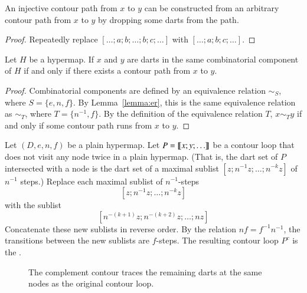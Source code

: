\begin{lemma} 
An injective contour path from
  $x$ to $y$ can be constructed from an arbitrary contour path from
  $x$ to $y$ by dropping some darts from the path.
\end{lemma}

\begin{proof} Repeatedly replace $[\ldots;a;b;\ldots;b;c;\ldots]$ with
$[\ldots;a;b;c;\ldots]$.
\end{proof}





\begin{lemma}\label{lemma:connect-contour}  
Let $H$ be a hypermap.
If $x$ and $y$ are darts in the same combinatorial component of $H$ if and only if
there exists a contour path from $x$ to $y$.
\end{lemma}

\begin{proof} 
Combinatorial components are defined by an equivalence relation $\sim_S$, where
$S = \{e,n,f\}$.  By Lemma~\ref{lemma:er}, this is the same equivalence relation as
$\sim_T$, where $T = \{n^{-1},f\}$.  By the definition of the equivalence relation $T$,
$x\sim_T y$ if and only if some contour path runs from $x$ to $y$.
\end{proof}
%

\begin{definition}[complement] 
Let $(D,e,n,f)$ be a plain hypermap.
Let $P={\llbracket{x;y;\ldots}\rrbracket}$ be a contour loop that does not visit any node
twice in a plain hypermap.   (That is, the dart set of $P$ intersected with a node
is the dart set of a maximal sublist $[z;n^{-1}z;\ldots;n^{-k}z]$ of $n^{-1}$ steps.)
 Replace each maximal sublist of
$n^{-1}$-steps
\[ 
[z;n^{-1} z; \ldots; n^{-k} z]
\] 
with the sublist
\[ 
[n^{-(k+1)} z;n^{-(k+2)} z;\ldots; n z]
\] 
Concatenate these new sublists in reverse order.  By the relation $n f = f^{-1} n^{-1}$,
the transitions between the new sublists are $f$-steps.
The resulting contour loop $P^c$
is the . 
\end{definition}

\begin{figure}[htb]
\centering
{}
\caption{The complement contour traces the remaining darts
at the same nodes as the original contour loop. }
\label{fig:contour-comp}
\end{figure}



